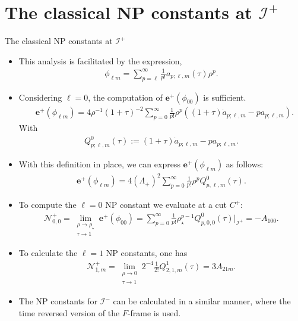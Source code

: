 \documentclass{beamer}
\theoremstyle{remark}
\theoremstyle{plain}
\theoremstyle{plain}
\begin{document}
\section{The classical NP constants at $\mathscr{I}^{+}$}
\begin{frame}{The classical NP constants at $\mathscr{I}^{+}$}
  \begin{itemize}
    \item This analysis is facilitated by the expression,
    \begin{align*}
      \phi_{\ell m}= \sum_{p=\ell}^{\infty}\frac{1}{p!}a_{p;\ell,m}(\tau)\rho^{p}.
    \end{align*}
    \item Considering $\ell=0$, the computation of $\boldsymbol{e}^{+}(\phi_{00})$ is sufficient.
    \begin{align}
      & \boldsymbol{e}^{+}(\phi_{\ell m}) = 4 \rho^{-1}(1+\tau)^{-2}\sum_{p=0}^{\infty} \frac{1}{p!}\rho^p((1+\tau)\dot{a}_{p;\ell,m}-p a_{p;\ell,m}). \nonumber
    \end{align}
    With
    \begin{align}
      Q^{0}_{p;\ell,m}(\tau):=(1+\tau)\dot{a}_{p;\ell,m}-p a_{p;\ell,m}. \nonumber
    \end{align}
    \item With this definition in place, we can express $\boldsymbol{e}^{+}(\phi_{\ell m})$ as follows:
    \begin{align}
      \boldsymbol{e}^{+}(\phi_{\ell m}) = 4 (\Lambda_{+})^{2}\sum_{p=0}^{\infty} \frac{1}{p!}\rho^{p}Q^{0}_{p,\ell,m}(\tau). \nonumber
    \end{align}
  \end{itemize}
\end{frame}

\begin{frame}
  \begin{itemize}
    \item To compute the $\ell=0$ NP constant we evaluate at a cut ${C}^{+}$:
    \begin{align}
      \mathcal{N}^{+}_{0,0}= \lim_{\substack{\rho \to \rho_{\star} \\ \tau \to 1}}  \boldsymbol{e}^{+}(\phi_{00}) =\sum_{p=0}^{\infty} \frac{1}{p!}\rho^{p-1}_{\star}Q^{0}_{p,0,0}(\tau)|_{\mathscr{I}^{+}} = -A_{100}. \nonumber
    \end{align}
    \item To calculate the $\ell = 1$ NP constants, one has\\
    \begin{align}
      \mathcal{N}^{+}_{1,m} = \lim _{\substack{\rho \rightarrow 0 \\ \tau \rightarrow 1}}2^{-4} \frac{1}{2 !} Q^{1}_{2, 1, m}(\tau) = 3A_{21m}. \nonumber
    \end{align}
    \item The NP constants for $\mathscr{I}^{-}$ can be calculated in a similar manner, where the time reversed version of the $F$-frame is used.
  \end{itemize}
\end{frame}
\end{document}
